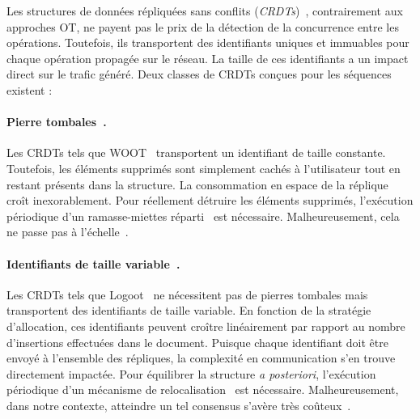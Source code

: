 Les structures de données répliquées sans conflits
(\emph{CRDTs})~\cite{burckhardt2014replicated, shapiro2011comprehensive,
shapiro2011conflict}, contrairement aux approches OT, ne payent pas le prix de
la détection de la concurrence entre les opérations. Toutefois, ils transportent
des identifiants uniques et immuables pour chaque opération propagée sur le
réseau. La taille de ces identifiants a un impact direct sur le trafic généré.
Deux classes de CRDTs conçues pour les séquences existent :

\paragraph{Pierre tombales~\cite{ahmed2011evaluating, attiya2016specification,
conway2014language, grishchenko2010deep, oster2006data, roh2011replicated,
weiss2007wooki, wu2010partial, yu2012stringwise}.} Les CRDTs tels que
WOOT~\cite{oster2006data} transportent un identifiant de taille constante.  
Toutefois, les éléments supprimés sont simplement cachés à l'utilisateur tout en
restant présents dans la structure. La consommation en espace de la réplique
croît inexorablement.
Pour réellement détruire les éléments supprimés, l'exécution périodique d'un
ramasse-miettes réparti~\cite{abdullahi1998garbage} est
nécessaire. Malheureusement, cela ne passe pas à
l'échelle~\cite{abdullahi1998garbage}.

\paragraph{Identifiants de taille variable~\cite{andre2013supporting,
 preguica2009commutative, weiss2009logoot}.} Les CRDTs tels que
Logoot~\cite{weiss2009logoot} ne nécessitent pas de pierres tombales mais
transportent des identifiants de taille variable. En fonction de la stratégie
d'allocation, ces identifiants peuvent croître linéairement par rapport au
nombre d'insertions effectuées dans le document. Puisque chaque identifiant doit
être envoyé à l'ensemble des répliques, la complexité en communication s'en
trouve directement impactée. Pour équilibrer la structure \emph{a posteriori},
l'exécution périodique d'un mécanisme de relocalisation~\cite{letia2009crdts}
est nécessaire. Malheureusement, dans notre contexte, atteindre un tel consensus
s'avère très coûteux~\cite{mostefaoui2015signature}.

